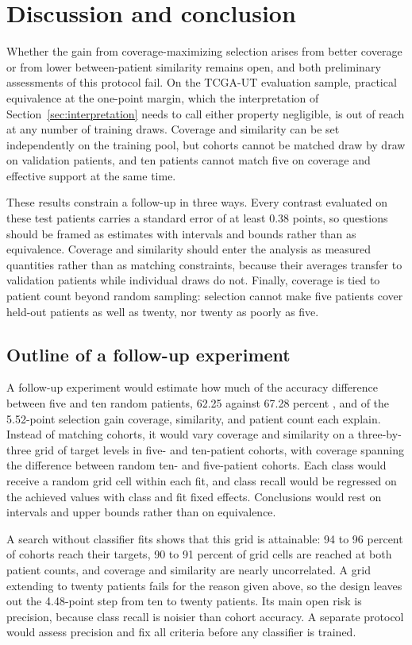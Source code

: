 \section{Discussion and conclusion}
\label{sec:discussion}
Whether the gain from coverage-maximizing selection arises from better coverage or from lower between-patient similarity remains open, and both preliminary assessments of this protocol fail. On the TCGA-UT evaluation sample, practical equivalence at the one-point margin, which the interpretation of Section~\ref{sec:interpretation} needs to call either property negligible, is out of reach at any number of training draws. Coverage and similarity can be set independently on the training pool, but cohorts cannot be matched draw by draw on validation patients, and ten patients cannot match five on coverage and effective support at the same time.

These results constrain a follow-up in three ways. Every contrast evaluated on these test patients carries a standard error of at least 0.38 points, so questions should be framed as estimates with intervals and bounds rather than as equivalence. Coverage and similarity should enter the analysis as measured quantities rather than as matching constraints, because their averages transfer to validation patients while individual draws do not. Finally, coverage is tied to patient count beyond random sampling: selection cannot make five patients cover held-out patients as well as twenty, nor twenty as poorly as five.

\subsection{Outline of a follow-up experiment}
\label{sec:follow-up}
A follow-up experiment would estimate how much of the accuracy difference between five and ten random patients, 62.25 against 67.28 percent \citep{queisler2026effectiveSupport}, and of the 5.52-point selection gain \citep{queisler2026shortageSelection} coverage, similarity, and patient count each explain. Instead of matching cohorts, it would vary coverage and similarity on a three-by-three grid of target levels in five- and ten-patient cohorts, with coverage spanning the difference between random ten- and five-patient cohorts. Each class would receive a random grid cell within each fit, and class recall would be regressed on the achieved values with class and fit fixed effects. Conclusions would rest on intervals and upper bounds rather than on equivalence.

A search without classifier fits shows that this grid is attainable: 94 to 96 percent of cohorts reach their targets, 90 to 91 percent of grid cells are reached at both patient counts, and coverage and similarity are nearly uncorrelated. A grid extending to twenty patients fails for the reason given above, so the design leaves out the 4.48-point step from ten to twenty patients. Its main open risk is precision, because class recall is noisier than cohort accuracy. A separate protocol would assess precision and fix all criteria before any classifier is trained.
